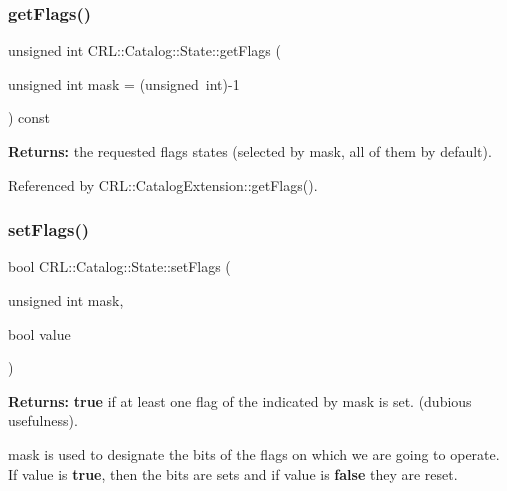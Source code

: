 \mbox{\label{classCRL_1_1Catalog_1_1State_a80ac3efddd043ec7151680755cc3db42}} 
\subsubsection{\texorpdfstring{get\+Flags()}{getFlags()}}
{\footnotesize\ttfamily unsigned int C\+R\+L\+::\+Catalog\+::\+State\+::get\+Flags (\begin{DoxyParamCaption}\item[{unsigned int}]{mask = {\ttfamily (unsigned~int)-\/1} }\end{DoxyParamCaption}) const\hspace{0.3cm}{\ttfamily [inline]}}

{\bfseries Returns\+:} the requested flags states (selected by {\ttfamily mask}, all of them by default). 

Referenced by C\+R\+L\+::\+Catalog\+Extension\+::get\+Flags().

\mbox{\label{classCRL_1_1Catalog_1_1State_a73a3866e9da359611638b2d725a79613}} 
\subsubsection{\texorpdfstring{set\+Flags()}{setFlags()}}
{\footnotesize\ttfamily bool C\+R\+L\+::\+Catalog\+::\+State\+::set\+Flags (\begin{DoxyParamCaption}\item[{unsigned int}]{mask,  }\item[{bool}]{value }\end{DoxyParamCaption})\hspace{0.3cm}{\ttfamily [inline]}}

{\bfseries Returns\+:} {\bfseries true} if at least one flag of the indicated by mask is set. (dubious usefulness).

{\ttfamily mask} is used to designate the bits of the flags on which we are going to operate. If {\ttfamily value} is {\bfseries true}, then the bits are sets and if {\ttfamily value} is {\bfseries false} they are reset. 

